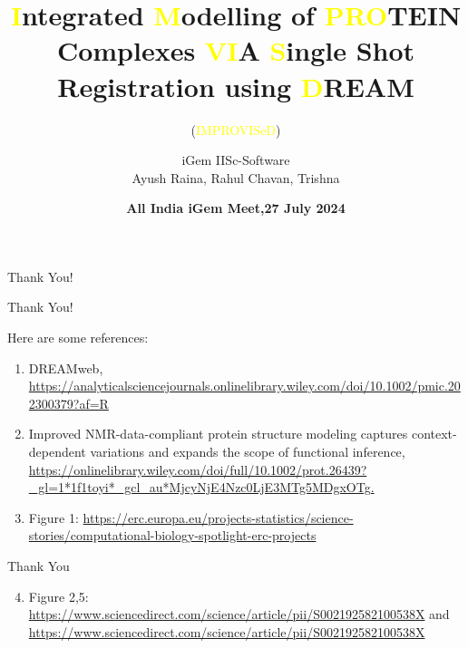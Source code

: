 \documentclass{beamer}
\author{iGem IISc-Software \\ Ayush Raina, Rahul Chavan, Trishna}
\title{\textcolor{yellow}{I}ntegrated \textcolor{yellow}{M}odelling of \textcolor{yellow}{PRO}TEIN Complexes \textcolor{yellow}{VI}A \textcolor{yellow}{S}ingle Shot Registration using \textcolor{yellow}{D}REAM}
\subtitle{(\textcolor{yellow}{IMPROVISeD})}
\date{\textcolor{mycolor}{\textbf{All India iGem Meet,27 July 2024}}}
\begin{document}
\begin{frame}
    \titlepage
\end{frame}







\begin{frame}{Thank You!}
    \begin{center}
        \Huge Thank You!
    \end{center}
    Here are some references:
    \begin{enumerate}
        \item DREAMweb, \url{https://analyticalsciencejournals.onlinelibrary.wiley.com/doi/10.1002/pmic.202300379?af=R}
        \item Improved NMR-data-compliant protein structure modeling captures context-dependent variations and expands the scope of functional inference, \url{https://onlinelibrary.wiley.com/doi/full/10.1002/prot.26439?_gl=1*1f1toyi*_gcl_au*MjcyNjE4Nzc0LjE3MTg5MDgxOTg.}
        \item Figure 1: \url{https://erc.europa.eu/projects-statistics/science-stories/computational-biology-spotlight-erc-projects}
    \end{enumerate}
\end{frame}

\begin{frame}{Thank You}

    \begin{enumerate}
        \setcounter{enumi}{3}
        \item Figure 2,5: \url{https://www.sciencedirect.com/science/article/pii/S002192582100538X} and \url{https://www.sciencedirect.com/science/article/pii/S002192582100538X}
    \end{enumerate}

\end{frame}
\end{document}

